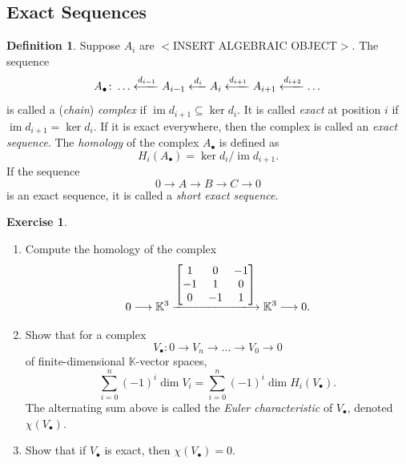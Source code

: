 \documentclass[12pt,a4paper]{article}
\newcommand{\KK}{\mathbb{K}}
\DeclareMathOperator{\image}{im}
\theoremstyle{definition}
\newtheorem{definition}[theorem]{Definition}
\newtheorem{exercise}[theorem]{Exercise}
\numberwithin{equation}{section}
\begin{document}
\subsection{Exact Sequences}
\begin{definition}
    Suppose $A_i$ are $<$INSERT ALGEBRAIC OBJECT$>$.
    The sequence
    \begin{equation*}
        A_\bullet \colon \dots \xlongleftarrow[]{d_{i-1}} A_{i-1} \xlongleftarrow[]{d_i} A_i \xlongleftarrow[]{d_{i+1}} A_{i+1} \xlongleftarrow[]{d_{i+2}} \dots
    \end{equation*}
    is called a (\emph{chain}) \emph{complex} if $\image{d_{i+1}} \subseteq \ker{d_i}$.
    It is called \emph{exact} at position $i$ if $\image{d_{i+1}} = \ker{d_i}$.
    If it is exact everywhere, then the complex is called an \emph{exact sequence}.    
    The \emph{homology} of the complex $A_\bullet$ is defined as
    \begin{equation*}
        H_i(A_\bullet) = \ker{d_i} / \image{d_{i+1}}.
    \end{equation*}
    If the sequence
    \begin{equation*}
        0 \longrightarrow A \longrightarrow B \longrightarrow C \longrightarrow 0
    \end{equation*}
    is an exact sequence, it is called a \emph{short exact sequence}.
\end{definition}

\begin{exercise}\label{exercise: homology of complex}
    \begin{enumerate}[label=(\alph*)]
        \item Compute the homology of the complex
        \begin{equation*}
            0 \longrightarrow \KK^3 \xlongrightarrow[]{\begin{bmatrix} 1 & 0 & -1 \\ -1 & 1 & 0 \\ 0 & -1 & 1 \end{bmatrix}} \KK^3 \longrightarrow 0.
        \end{equation*}

        \item Show that for a complex
        \begin{equation*}
            V_\bullet \colon 0 \longrightarrow V_n \longrightarrow \dots \longrightarrow V_0 \longrightarrow 0
        \end{equation*}
        of finite-dimensional $\KK$-vector spaces,
        \begin{equation*}
            \sum_{i=0}^n (-1)^i \dim{V_i} = \sum_{i=0}^n (-1)^i \dim{H_i(V_\bullet)}.
        \end{equation*}
        The alternating sum above is called the \emph{Euler characteristic} of $V_\bullet$, denoted $\chi(V_\bullet)$.

        \item Show that if $V_\bullet$ is exact, then $\chi(V_\bullet) = 0$.
    \end{enumerate}
\end{exercise}
\end{document}
